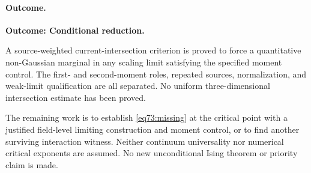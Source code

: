 \documentclass[11pt,a4paper]{article}
\numberwithin{equation}{section}
\begin{document}
\paragraph{Outcome.}
\textbf{Outcome: Conditional reduction.}

A source-weighted current-intersection criterion is proved to force a
quantitative non-Gaussian marginal in any scaling limit satisfying the
specified moment control. The first- and second-moment roles, repeated
sources, normalization, and weak-limit qualification are all separated.
No uniform three-dimensional intersection estimate has been proved.

The remaining work is to establish \eqref{eq73:missing} at the critical
point with a justified field-level limiting construction and moment control,
or to find another surviving interaction witness. Neither continuum
universality nor numerical critical exponents are assumed. No new
unconditional Ising theorem or priority claim is made.

\needspace{170mm}
\end{document}
